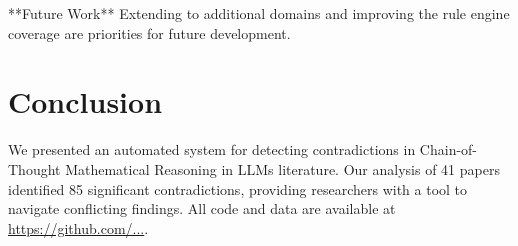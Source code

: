 \documentclass[11pt]{article}
\begin{document}
**Future Work** Extending to additional domains and improving the rule engine coverage
are priorities for future development.

\section{Conclusion}
We presented an automated system for detecting contradictions in Chain-of-Thought Mathematical Reasoning in LLMs literature.
Our analysis of 41 papers identified 85 significant contradictions,
providing researchers with a tool to navigate conflicting findings.
All code and data are available at \url{https://github.com/...}.
\end{document}
